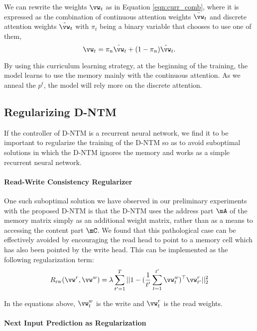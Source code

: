 \documentclass[12pt]{article}
\begin{document}
We can rewrite the weights $\vw_t$ as in Equation \eqref{eqn:curr_comb}, where it is expressed as the combination of continuous attention weights $\bar{\vw}_t$ and discrete attention weights $\tilde{\vw}_t$ with $\pi_t$ being a binary variable that chooses to use one of them,
\begin{equation}
    \label{eqn:curr_comb}
    \vw_t = \pi_n \bar{\vw}_t + (1-\pi_n) \tilde{\vw}_t.    
\end{equation}


By using this curriculum learning strategy, at the beginning of the training, the model learns to use the memory mainly with the continuous attention. As we anneal the $p^t$, the model will rely more on the discrete attention.


\subsection{Regularizing D-NTM}
\label{sec:reg_dntm}

If the controller of D-NTM is a recurrent neural network, we find it to be
important to regularize the training of the D-NTM so as to avoid suboptimal
solutions in which the D-NTM ignores the memory and works as a simple recurrent
neural network. 

\paragraph{Read-Write Consistency Regularizer}


One such suboptimal solution we have observed in our preliminary experiments
with the proposed D-NTM is that the D-NTM uses the address part $\mA$ of the
memory matrix simply as an additional weight matrix, rather than as a means to
accessing the content part $\mC$. We found that this pathological case can be
effectively avoided by encouraging the read head to point to a memory cell which
has also been pointed by the write head. This can be implemented as the
following regularization term:
\begin{align}
    R_{\text{rw}}(\vw^r, \vw^w) = \lambda \sum_{t'=1}^{T}||1 -
    (\frac{1}{t'}\sum_{t=1}^{t'}\vw^w_t)^{\top}\vw^r_{t'} ||_2^2
\end{align}

In the equations above, $\vw^w_t$ is the write and $\vw^r_{t}$ is the read weights.

\paragraph{Next Input Prediction as Regularization}
\end{document}
